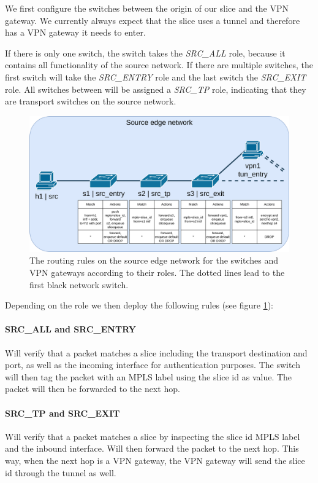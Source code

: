 We first configure the switches between the origin of our slice and the VPN gateway. We currently always expect that the slice uses a tunnel and therefore has a VPN gateway it needs to enter.

If there is only one switch, the switch takes the \textit{SRC\_ALL} role, because it contains all functionality of the source network. If there are multiple switches, the first switch will take the \textit{SRC\_ENTRY} role and the last switch the \textit{SRC\_EXIT} role. All switches between will be assigned a \textit{SRC\_TP} role, indicating that they are transport switches on the source network.

\begin{figure}[ht]
  \centering
  \includegraphics[width=\linewidth]{images/chapter_6/routing_source.png}
  \caption[Routing on the source edge network]{The routing rules on the source edge network for the switches and VPN gateways according to their roles. The dotted lines lead to the first black network switch.}
  \label{fig:routing_source}
\end{figure}

Depending on the role we then deploy the following rules (see figure \ref{fig:routing_source}):

\paragraph{SRC\_ALL and SRC\_ENTRY} Will verify that a packet matches a slice including the transport destination and port, as well as the incoming interface for authentication purposes. The switch will then tag the packet with an MPLS label using the slice id as value. The packet will then be forwarded to the next hop.

\paragraph{SRC\_TP and SRC\_EXIT} Will verify that a packet matches a slice by inspecting the slice id MPLS label and the inbound interface. Will then forward the packet to the next hop. This way, when the next hop is a VPN gateway, the VPN gateway will send the slice id through the tunnel as well.

